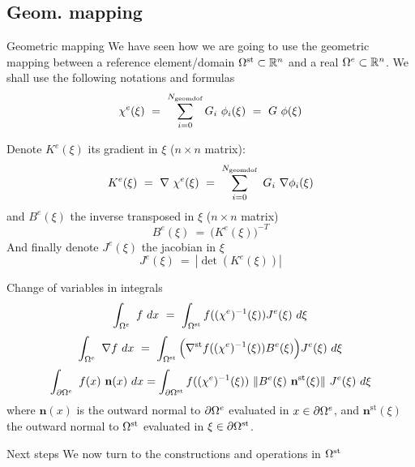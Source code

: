 \subsection{Geom. mapping}
\label{sec:geom.-mapping}
\begin{frame}{Geometric mapping}
  We have seen how we are going to use the geometric mapping between a
  reference element/domain ${\Omega^{\text{st}}} \subset {\ensuremath{\mathbb{R}^{n}}}$ and a real ${\Omega^{e}} \subset {\ensuremath{\mathbb{R}^{n}}}$.
  We shall use the following notations  and formulas
  \begin{equation}
    \label{eq:66}
    \chi^e( \xi )\ =\ \sum_{i=0}^{\ngdof} G_i\ \phi_i (\xi)\ =\ G\ \phi(\xi) 
  \end{equation}
  
  Denote $K^e(\xi)$ its gradient in $\xi$ ($n\times n$ matrix):
  \begin{equation}
    \label{eq:67}
    K^e( \xi )\ =\ \nabla\ \chi^e (\xi )\ =\ \sum_{i=0}^{\ngdof}\ G_i\ \nabla \phi_i (\xi)
  \end{equation}
  and $B^e(\xi)$ the inverse transposed in $\xi$ ($n\times n$ matrix)
  \begin{equation}
    \label{eq:68}
    B^e( \xi )\ =\ \Big(K^e(\xi)\Big)^{-T}
  \end{equation}
  And finally denote $J^e(\xi)$ the jacobian in $\xi$
  \begin{equation}
    \label{eq:69}
    J^e(\xi)\ =\ |\det( K^e(\xi) )|
  \end{equation}
\end{frame}

\begin{frame}{Change of variables in integrals}
    \begin{equation}
      \label{eq:71}
      \int_{{\Omega^{e}}} \ f\ dx\ =\ \int_{{\Omega^{\text{st}}}} f( (\chi^e)^{-1}(\xi) ) J^e( \xi )\ d \xi
  \end{equation}
  \begin{equation}
    \label{eq:70}
    \int_{{\Omega^{e}}}\ \nabla f\ dx\ =\ \int_{{\Omega^{\text{st}}}} \Big(\nabla^{\text{st}} f( (\chi^e)^{-1}(\xi) ) B^e(\xi)\Big) J^e( \xi )\ d \xi
  \end{equation}
  \begin{equation}
    \label{eq:65}
    \int_{\partial \Om{e}}\ f( x )\ \mathbf{n}(x)\ dx = \int_{\partial \Omst} f( (\chi^e)^{-1}(\xi) )\  \| B^e(\xi) \ \mathbf{n^{\text{st}}}(\xi) \|\ J^e( \xi )\ d \xi
  \end{equation}
  where $\mathbf{n}(x)$ is the outward normal to $\partial {\ensuremath{\Omega^{e}}}$
  evaluated in $x \in \partial {\ensuremath{\Omega^{e}}}$, and $\mathbf{n}^{\text{st}}(\xi)$
  the outward normal to ${\Omega^{\text{st}}}$ evaluated in $\xi \in \partial {\ensuremath{\Omega^{\text{st}}}}$.
\end{frame}

\begin{frame}{Next steps}
  We now turn to the constructions and operations in ${\Omega^{\text{st}}}$
\end{frame}






